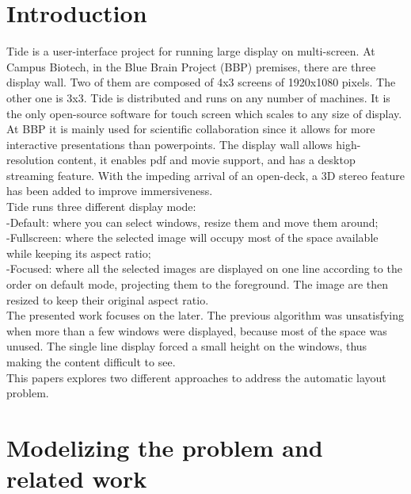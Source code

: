 \documentclass{acmtog}
\begin{document}
\section{Introduction}
Tide is a user-interface project for running large display on multi-screen. At Campus Biotech, in the Blue Brain Project (BBP) premises, there are three display wall. Two of them are composed of 4x3 screens of 1920x1080 pixels. The other one is 3x3. Tide is distributed and runs on any number of machines. It is the only open-source software for touch screen which scales to any size of display. At BBP it is mainly used for scientific collaboration since it allows for more interactive presentations  than powerpoints. The display wall allows  high-resolution content, it enables pdf and movie support, and has a desktop streaming feature. With the impeding arrival of an open-deck, 
a 3D stereo feature has been added to improve immersiveness. \\
Tide runs three different display mode:\\
-Default: where you can select windows, resize them and move them around; \\
-Fullscreen: where the selected image will occupy most of the space available while keeping its aspect ratio; \\
-Focused: where  all the selected images are displayed on one line according to the order on default mode, projecting them to the foreground. The image are then resized to keep their original aspect ratio.\\
The presented work focuses on the later. 
The previous algorithm was unsatisfying when more than a few windows were displayed, because most of the space was unused. The single line display forced a small height on the windows, thus making the content difficult to see.  \\
This papers explores two different approaches to address the automatic layout problem.\\


\section{Modelizing the problem and related work}
\end{document}
